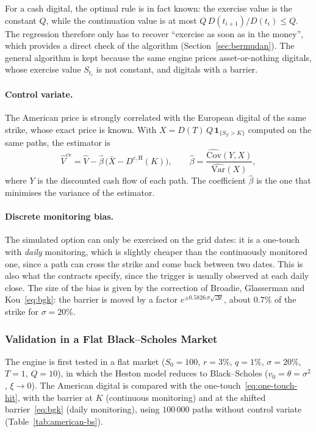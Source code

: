 \documentclass[11pt,a4paper]{article}
\theoremstyle{remark}
\newcommand{\ind}{\mathbf{1}}
\begin{document}
For a cash digital, the optimal rule is in fact known: the exercise value is
the constant $Q$, while the continuation value is at most $Q\,D(t_{i+1})/D(t_i)
\leq Q$. The regression therefore only has to recover ``exercise as soon as in
the money'', which provides a direct check of the algorithm
(Section~\ref{sec:bermudan}). The general algorithm is kept because the same
engine prices asset-or-nothing digitals, whose exercise value $S_{t_i}$ is not
constant, and digitals with a barrier.

\paragraph{Control variate.}
The American price is strongly correlated with the European digital of the
same strike, whose exact price is known.
With $X = D(T)\,Q\,\ind_{\{S_T > K\}}$ computed on the same paths, the
estimator is
\begin{equation}
  \hat V^{\mathrm{cv}} = \hat V - \hat\beta\,\bigl(\bar X - D^{c,\mathrm{H}}(K)\bigr),
  \qquad
  \hat\beta = \frac{\widehat{\mathrm{Cov}}(Y, X)}{\widehat{\mathrm{Var}}(X)},
  \label{eq:control-variate}
\end{equation}
where $Y$ is the discounted cash flow of each path. The coefficient
$\hat\beta$ is the one that minimises the variance of the estimator.

\paragraph{Discrete monitoring bias.}
The simulated option can only be exercised on the grid dates: it is a
one-touch with \emph{daily} monitoring, which is slightly cheaper than the
continuously monitored one, since a path can cross the strike and come back
between two dates. This is also what the contracts specify, since the trigger
is usually observed at each daily close. The size of the bias is given by the
correction of Broadie, Glasserman and Kou~\eqref{eq:bgk}: the barrier is
moved by a factor $e^{\pm 0.5826\,\sigma\sqrt{\Delta t}}$, about $0.7\%$ of the
strike for $\sigma = 20\%$.

\subsubsection{Validation in a Flat Black--Scholes Market}

The engine is first tested in a flat market ($S_0 = 100$, $r = 3\%$,
$q = 1\%$, $\sigma = 20\%$, $T = 1$, $Q = 10$), in which the Heston model
reduces to Black--Scholes ($v_0 = \theta = \sigma^2$, $\xi \to 0$). The
American digital is compared with the one-touch~\eqref{eq:one-touch-hit}, with
the barrier at $K$ (continuous monitoring) and at the shifted
barrier~\eqref{eq:bgk} (daily monitoring), using $100\,000$ paths without
control variate (Table~\ref{tab:american-bs}).
\end{document}
